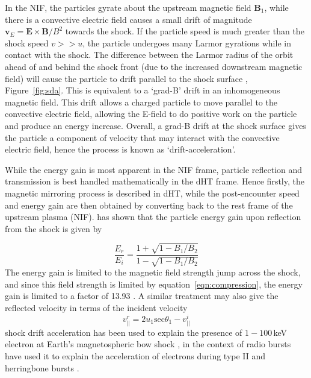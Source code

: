 In the NIF, the particles gyrate about the upstream magnetic field $\mathbf{B}_1$, while there is a convective electric field causes a small drift of magnitude $\mathbf{v}_E = \mathbf{E}\times \mathbf{B}/B^2$ towards the shock. If the particle speed is much greater than the shock speed $v>>u$, the particle undergoes many Larmor gyrations while in contact with the shock. The difference between the Larmor radius of the orbit ahead of and behind the shock front (due to the increased downstream magnetic field) will cause the particle to drift parallel to the shock surface \citep{ball2001, toptychin1980}, Figure~\ref{fig:sda}. This is equivalent to a \textquoteleft grad-B' drift in an inhomogeneous magnetic field. This drift allows a charged particle to move parallel to the convective electric field, allowing the E-field to do positive work on the particle and produce an energy increase. Overall, a grad-B drift at the shock surface gives the particle a component of velocity that may interact with the convective electric field, hence the process is known as \textquoteleft drift-acceleration'.


While the energy gain is most apparent in the NIF frame, particle reflection and transmission is best handled mathematically in the dHT frame. Hence firstly, the magnetic mirroring process is described in dHT, while the post-encounter speed and energy gain are then obtained by converting back to the rest frame of the upstream plasma (NIF). \citet{ball2001} has shown that the particle energy gain upon reflection from the shock is given by 

\begin{equation}
\frac{E_r}{E_i} = \frac{1+\sqrt{1-B_1/B_2}}{1-\sqrt{1-B_1/B_2}}
\end{equation}
The energy gain is limited to the magnetic field strength jump across the shock, and since this field strength is limited by equation~\ref{eqn:compression}, the energy gain is limited to a factor of 13.93 \citep{ball2001}. A similar treatment may also give the reflected velocity in terms of the incident velocity \citep{holman1983}
\begin{equation}
v^r_{||} = 2u_1\mathrm{sec}\theta_1 - v^i_{||}
\end{equation}
shock drift acceleration has been used to explain the presence of $1-100$\,keV electron at Earth's magnetospheric bow shock \citep{wu1984}, in the context of radio bursts have used it to explain the acceleration of electrons during type II and herringbone bursts \citep{holman1983, mann2005, schmidt2012b}. 

